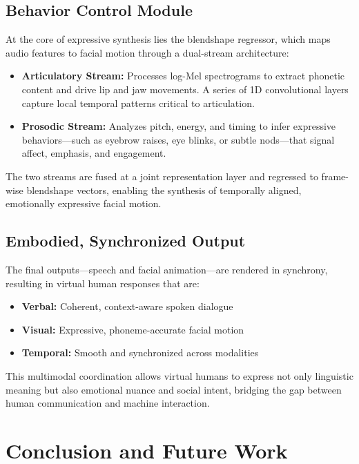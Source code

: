 \documentclass[runningheads]{llncs}
\begin{document}
\subsection{Behavior Control Module}

At the core of expressive synthesis lies the blendshape regressor, which maps audio features to facial motion through a dual-stream architecture:

\begin{itemize}
  \item \textbf{Articulatory Stream:} Processes log-Mel spectrograms to extract phonetic content and drive lip and jaw movements. A series of 1D convolutional layers capture local temporal patterns critical to articulation.
  
  \item \textbf{Prosodic Stream:} Analyzes pitch, energy, and timing to infer expressive behaviors—such as eyebrow raises, eye blinks, or subtle nods—that signal affect, emphasis, and engagement.
\end{itemize}

The two streams are fused at a joint representation layer and regressed to frame-wise blendshape vectors, enabling the synthesis of temporally aligned, emotionally expressive facial motion.

\subsection{Embodied, Synchronized Output}

The final outputs—speech and facial animation—are rendered in synchrony, resulting in virtual human responses that are:

\begin{itemize}
  \item \textbf{Verbal:} Coherent, context-aware spoken dialogue
  \item \textbf{Visual:} Expressive, phoneme-accurate facial motion
  \item \textbf{Temporal:} Smooth and synchronized across modalities
\end{itemize}

This multimodal coordination allows virtual humans to express not only linguistic meaning but also emotional nuance and social intent, bridging the gap between human communication and machine interaction.


\section{Conclusion and Future Work}
\end{document}
